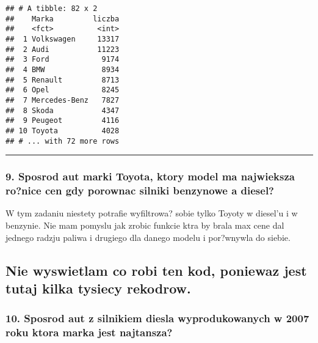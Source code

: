 \documentclass[]{article}
\newenvironment{Shaded}{\begin{snugshade}}{\end{snugshade}}
\newcommand{\KeywordTok}[1]{\textcolor[rgb]{0.13,0.29,0.53}{\textbf{#1}}}
\newcommand{\DecValTok}[1]{\textcolor[rgb]{0.00,0.00,0.81}{#1}}
\newcommand{\StringTok}[1]{\textcolor[rgb]{0.31,0.60,0.02}{#1}}
\newcommand{\OperatorTok}[1]{\textcolor[rgb]{0.81,0.36,0.00}{\textbf{#1}}}
\newcommand{\NormalTok}[1]{#1}
\begin{document}
\begin{verbatim}
## # A tibble: 82 x 2
##    Marka         liczba
##    <fct>          <int>
##  1 Volkswagen     13317
##  2 Audi           11223
##  3 Ford            9174
##  4 BMW             8934
##  5 Renault         8713
##  6 Opel            8245
##  7 Mercedes-Benz   7827
##  8 Skoda           4347
##  9 Peugeot         4116
## 10 Toyota          4028
## # ... with 72 more rows
\end{verbatim}

\begin{center}\rule{0.5\linewidth}{\linethickness}\end{center}

\subsubsection{9. Sposrod aut marki Toyota, ktory model ma najwieksza
ro?nice cen gdy porownac silniki benzynowe a
diesel?}\label{sposrod-aut-marki-toyota-ktory-model-ma-najwieksza-ronice-cen-gdy-porownac-silniki-benzynowe-a-diesel}

W tym zadaniu niestety potrafie wyfiltrowa? sobie tylko Toyoty w
diesel'u i w benzynie. Nie mam pomyslu jak zrobic funkcie ktra by brala
max cene dal jednego radzju paliwa i drugiego dla danego modelu i
por?wnywla do siebie.

\subsection{Nie wyswietlam co robi ten kod, poniewaz jest tutaj kilka
tysiecy
rekodrow.}\label{nie-wyswietlam-co-robi-ten-kod-poniewaz-jest-tutaj-kilka-tysiecy-rekodrow.}

\subsubsection{10. Sposrod aut z silnikiem diesla wyprodukowanych w 2007
roku ktora marka jest
najtansza?}\label{sposrod-aut-z-silnikiem-diesla-wyprodukowanych-w-2007-roku-ktora-marka-jest-najtansza}

\begin{Shaded}
\end{Shaded}
\end{document}
